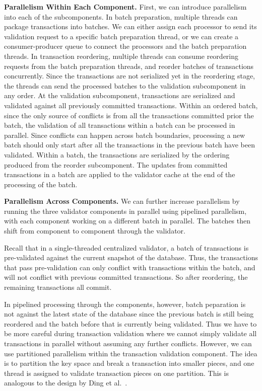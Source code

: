 {\bf Parallelism Within Each Component.}
First, we can introduce parallelism into each of the subcomponents. In batch preparation, multiple threads can package transactions into batches. We can either assign each processor to send its validation request to a specific batch preparation thread, or we can create a consumer-producer queue to connect the processors and the batch preparation threads. In transaction reordering, multiple threads can consume reordering requests from the batch preparation threads, and reorder batches of transactions concurrently. Since the transactions are not serialized yet in the reordering stage, the threads can send the processed batches to the validation subcomponent in any order. At the validation subcomponent, transactions are serialized and validated against all previously committed transactions. 
Within an ordered batch, since the only source of conflicts is from all the transactions committed prior the batch, the validation of all transactions within a batch can be processed in parallel. Since conflicts can happen across batch boundaries, processing a new batch should only start after all the transactions in the previous batch have been validated. Within a batch, the transactions are serialized by the ordering produced from the reorder subcomponent. The updates from committed transactions in a batch are applied to the validator cache at the end of the processing of the batch. 

{\bf Parallelism Across Components.}
We can further increase parallelism by running the three validator components in parallel using pipelined parallelism, 
with each component working on a different batch in parallel. The batches then shift from component to component through the validator.

Recall that in a single-threaded centralized validator, a batch of transactions is
pre-validated against the current snapshot of the database. Thus, the
transactions that pass pre-validation can only conflict with transactions within the batch, and will not conflict with previous committed transactions. So after reordering, the remaining transactions all commit.

In pipelined processing through the components, however, batch peparation is not against the latest state of the database since the previous batch is still being reordered and the batch before that is currently being validated. Thus we have to be more careful during transaction validation where we cannot simply validate all transactions in parallel without assuming any further conflicts. However, we can use partitioned parallelism within the transaction validation component. The idea is to partition the key space and break a transaction into smaller pieces, and one thread is assigned to validate transaction pieces on one partition. This is analogous to the design by Ding et al.~\cite{ding2015centiman}.




